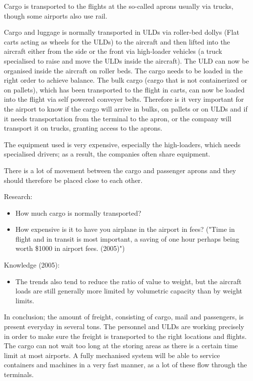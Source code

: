 Cargo is transported to the flights at the so-called aprons usually via trucks, though some airports also use rail.

Cargo and luggage is normally transported in ULDs via roller-bed dollys (Flat carts acting as wheels for the ULDs) to the aircraft and then lifted into the aircraft either from the side or the front via high-loader vehicles (a truck specialised to raise and move the ULDs inside the aircraft).
The ULD can now be organised inside the aircraft on roller beds. The cargo needs to be loaded in the right order to achieve balance. The bulk cargo (cargo that is not containerized or on pallets), which has been transported to the flight in carts, can now be loaded into the flight via self powered conveyer belts. Therefore is it very important for the airport to know if the cargo will arrive in bulks, on pallets or on ULDs and if it needs transportation from the terminal to the apron, or the company will transport it on trucks, granting access to the aprons.

The equipment used is very expensive, especially the high-loaders, which needs specialised drivers; as a result, the companies often share equipment.

There is a lot of movement between the cargo and passenger aprons and they should therefore be placed close to each other.%

Research:
\begin{itemize}
\item How much cargo is normally transported?
\item How expensive is it to have you airplane in the airport in fees? ("Time in flight and in transit is most important, a saving of one hour perhaps being worth \$1000 in airport fees. (2005)")
\end{itemize}


Knowledge (2005):
\begin{itemize}
\item The trends also tend to reduce the ratio of value to weight, but the aircraft loads are still generally more limited by volumetric capacity than by weight limits.
\end{itemize}

In conclusion; the amount of freight, consisting of cargo, mail and passengers, is present everyday in several tons. The personnel and ULDs are working precisely  in order to make sure the freight is transported to the right locations and flights. The cargo can not wait too long at the storing areas as there is a certain time limit at  most airports. A fully mechanised system will be able to service containers and machines in a very fast manner, as a lot of these flow through the terminals.
